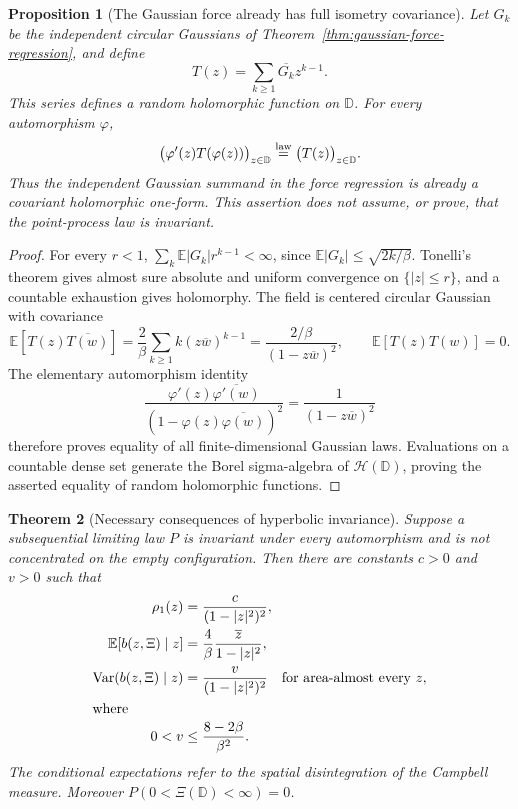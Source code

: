 \documentclass[11pt,a4paper]{article}
\numberwithin{equation}{section}
\newtheorem{theorem}{Theorem}[section]
\newtheorem{proposition}[theorem]{Proposition}
\theoremstyle{definition}
\theoremstyle{remark}
\newcommand{\D}{\mathbb D}
\newcommand{\E}{\mathbb E}
\begin{document}
\begin{proposition}[The Gaussian force already has full isometry covariance]
\label{prop:gaussian-force-hyperbolic-covariance}
Let $G_k$ be the independent circular Gaussians of
Theorem~\ref{thm:gaussian-force-regression}, and define
\[
 T(z)=\sum_{k\ge1}\overline{G_k}z^{k-1}.
\]
This series defines a random holomorphic function on $\D$. For every
automorphism $\varphi$,
\begin{equation}\label{eq:gaussian-force-isometry-law}
 \bigl(\varphi'(z)T(\varphi(z))\bigr)_{z\in\D}
       \stackrel{\rm law}=\bigl(T(z)\bigr)_{z\in\D}.
\end{equation}
Thus the independent Gaussian summand in the force regression is
already a covariant holomorphic one-form. This assertion does not
assume, or prove, that the point-process law is invariant.
\end{proposition}

\begin{proof}
For every $r<1$,
$\sum_k \E|G_k|r^{k-1}<\infty$, since
$\E|G_k|\le\sqrt{2k/\beta}$.
Tonelli's theorem gives almost sure absolute and uniform convergence on
$\{|z|\le r\}$, and a countable exhaustion gives holomorphy. The field
is centered circular Gaussian with covariance
\[
 \E[T(z)\overline{T(w)}]
   =\frac2\beta\sum_{k\ge1}k(z\overline w)^{k-1}
   =\frac{2/\beta}{(1-z\overline w)^2},
 \qquad \E[T(z)T(w)]=0.
\]
The elementary automorphism identity
\[
 \frac{\varphi'(z)\overline{\varphi'(w)}}
      {(1-\varphi(z)\overline{\varphi(w)})^2}
      =\frac1{(1-z\overline w)^2}
\]
therefore proves equality of all finite-dimensional Gaussian laws.
Evaluations on a countable dense set generate the Borel sigma-algebra
of $\mathcal H(\D)$, proving the asserted equality of random
holomorphic functions.
\end{proof}

\begin{theorem}[Necessary consequences of hyperbolic invariance]
\label{thm:hyperbolic-invariant-score-constraint}
Suppose a subsequential limiting law $P$ is invariant under every
automorphism and is not concentrated on the empty configuration. Then
there are constants $c>0$ and $v>0$ such that
\begin{align}
 \rho_1(z)&=\frac{c}{(1-|z|^2)^2},
       \label{eq:invariant-intensity-constant}\\
 \E[b(z,\Xi)\mid z]&=\frac4\beta\frac{\overline z}{1-|z|^2},
       \label{eq:invariant-score-mean}\\
 \operatorname{Var}(b(z,\Xi)\mid z)
       &=\frac{v}{(1-|z|^2)^2}\quad\hbox{for area-almost every }z,
       \label{eq:invariant-score-variance}\\
 \intertext{where}
 0<v&\le\frac{8-2\beta}{\beta^2}.
       \label{eq:invariant-score-budget}
\end{align}
The conditional expectations refer to the spatial disintegration of
the Campbell measure. Moreover
$P(0<\Xi(\D)<\infty)=0$.
\end{theorem}
\end{document}
